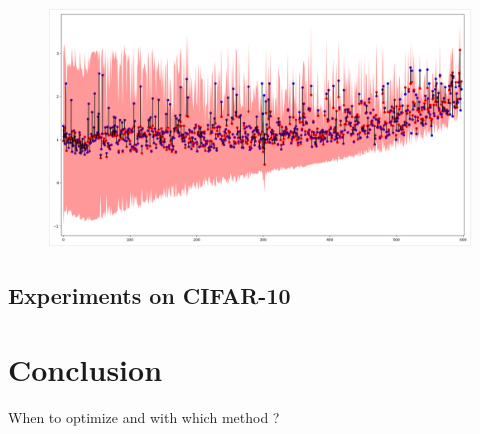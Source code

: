 \begin{figure}[htb]
	\centering
	\includegraphics[width=.95\linewidth]{img_hyperopt/bo_error_time.png}
	\label{fig:bo_error_time}
\end{figure}

\subsection{Experiments on CIFAR-10}

\section{Conclusion}

When to optimize and with which method ?

